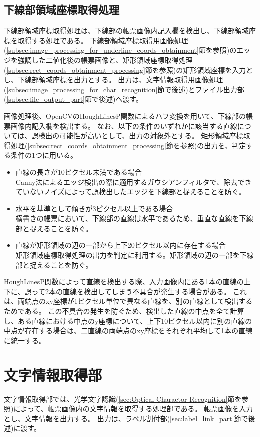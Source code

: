 \subsection{下線部領域座標取得処理}\label{subsec:underline_coords_obtainment_processing}
下線部領域座標取得処理は、下線部の帳票画像内記入欄を検出し、下線部領域座標を取得する処理である。
下線部領域座標取得用画像処理(\ref{subsec:image_processing_for_underline_coords_obtainment}節を参照)のエッジを強調した二値化後の帳票画像と、矩形領域座標取得処理(\ref{subsec:rect_coords_obtainment_processing}節を参照)の矩形領域座標を入力とし、下線部領域座標を出力とする。
出力は、文字情報取得用画像処理(\ref{subsec:image_processing_for_char_recognition}節で後述)とファイル出力部(\ref{subsec:file_output_part}節で後述)へ渡す。

画像処理後、OpenCVのHoughLinesP関数によるハフ変換を用いて、下線部の帳票画像内記入欄を検出する。
なお、以下の条件のいずれかに該当する直線については、誤検出の可能性が高いとして、出力の対象外とする。
矩形領域座標取得処理(\ref{subsec:rect_coords_obtainment_processing}節を参照)の出力を、判定する条件の1つに用いる。

\begin{itemize}
    \item 直線の長さが10ピクセル未満である場合\\
        Canny法によるエッジ検出の際に適用するガウシアンフィルタで、除去できていないノイズによって誤検出したエッジを下線部と捉えることを防ぐ。
    \item 水平を基準として傾きが3ピクセル以上である場合\\
        横書きの帳票において、下線部の直線は水平であるため、垂直な直線を下線部と捉えることを防ぐ。
    \item 直線が矩形領域の辺の一部から上下20ピクセル以内に存在する場合\\
        矩形領域座標取得処理の出力を判定に利用する。矩形領域の辺の一部を下線部と捉えることを防ぐ。
\end{itemize}

HoughLinesP関数によって直線を検出する際、入力画像内にある1本の直線の上下に、誤って2本の直線を検出してしまう不具合が発生する場合がある。
これは、両端点のxy座標が1ピクセル単位で異なる直線を、別の直線として検出するためである。
この不具合の発生を防ぐため、検出した直線の中点を全て計算し、ある直線における中点のy座標について、上下10ピクセル以内に別の直線の中点が存在する場合は、二直線の両端点のxy座標をそれぞれ平均して1本の直線に統一する。

\section{文字情報取得部}\label{sec:OCR_part}
文字情報取得部では、光学文字認識(\ref{sec:Optical-Charactor-Recognition}節を参照)によって、帳票画像内の文字情報を取得する処理部である。
帳票画像を入力とし、文字情報を出力する。
出力は、ラベル割付部(\ref{sec:label_link_part}節で後述)に渡す。

